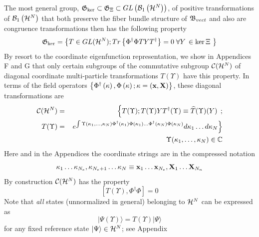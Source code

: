 The most general group, ${\frak G}_{\ker }\subset {\frak G}_{\Xi }\subset
GL\left( {\cal B}_{1}\left( {\cal H}^{N}\right) \right) $, of positive
transformations of ${\cal B}_{1}\left( {\cal H}^{N}\right) $ that both
preserve the fiber bundle structure of ${\frak B}_{vect}$ and also are
congruence transformations then has the following property 
\begin{equation}
{\frak G}_{\ker }=\left\{ T\in GL({\cal H}^{N});T{\sl r}\left\{ \Phi
^{\dagger }\Phi TYT^{\dagger }\right\} =0\;\forall Y\,\in \ker \Xi \text{ }%
\right\}  \label{GLkerXi}
\end{equation}%
By resort to the coordinate eigenfunction representation, we show in
Appendices F and G that only certain subgroups of the commutative subgroup $%
{\cal C}({\cal H}^{N})$ of diagonal coordinate multi-particle
transformations $T(\Upsilon )$ have this property. In terms of the field
operators $\left\{ \Phi ^{\dagger }\left( \kappa \right) ,\Phi \left( \kappa
\right) ;\kappa =\left( {\bf x},{\bf X}\right) \right\} $, these diagonal
transformations are 
\begin{eqnarray}
{\cal C}({\cal H}^{N}) &=&\left\{ T(\Upsilon );T(\Upsilon )YT^{\dagger
}(\Upsilon )\equiv \widehat{T}(\Upsilon )(Y)\right. \,;  \nonumber \\
T(\Upsilon ) &=&\left. e^{\int \Upsilon (\kappa _{1},\ldots ,\kappa
_{N})\Phi ^{\dagger }(\kappa _{1})\Phi (\kappa _{1})\ldots \Phi ^{\dagger
}(\kappa _{N})\Phi (\kappa _{N})}d\kappa _{1}\ldots d\kappa _{N}\right\} 
\nonumber \\
&&\Upsilon (\kappa _{1},\ldots ,\kappa _{N})\in {\Bbb C}
\end{eqnarray}%
Here and in the Appendices the coordinate strings are in the compressed
notation 
\begin{equation}
\kappa _{1}\ldots \kappa _{N_{e}},\kappa _{N_{e}+1}\ldots \kappa _{N}\equiv 
{\bf x}_{1}\ldots {\bf x}_{N_{e}},{\bf X}_{1}\ldots {\bf X}_{N_{n}}
\label{compressed}
\end{equation}%
By construction ${\cal C}({\cal H}^{N})$ has the property 
\begin{equation}
\left[ T(\Upsilon ),\Phi ^{\dagger }\Phi \right] =0
\end{equation}%
Note that {\em all} states (unnormalized in general) belonging to ${\cal H}%
^{N}$ can be expressed as 
\begin{equation}
|\Psi (\Upsilon )\rangle =T(\Upsilon )|\Psi \rangle
\end{equation}%
for any fixed reference state $|\Psi \rangle \in {\cal H}^{N}$; see Appendix
